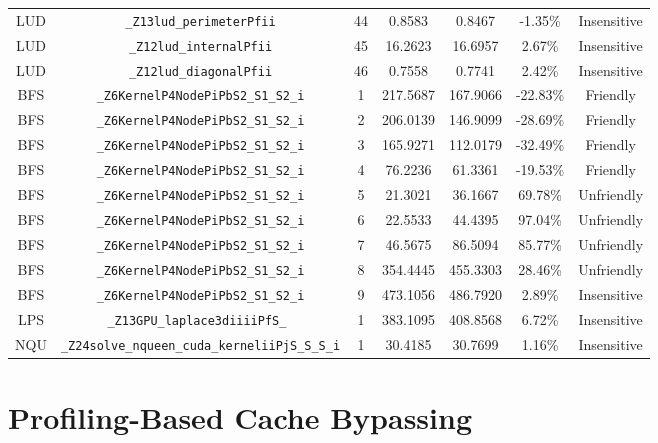 \documentclass{article}
\begin{document}
\begin{table}[H]
\begin{tabular}{c c c c c c c}
		LUD       & \verb|_Z13lud_perimeterPfii|                   & 44  & 0.8583   & 0.8467        & -1.35\%     & Insensitive \\
		LUD       & \verb|_Z12lud_internalPfii|                    & 45  & 16.2623  & 16.6957       & 2.67\%      & Insensitive \\
		LUD       & \verb|_Z12lud_diagonalPfii|                    & 46  & 0.7558   & 0.7741        & 2.42\%      & Insensitive \\
		BFS       & \verb|_Z6KernelP4NodePiPbS2_S1_S2_i|           & 1   & 217.5687 & 167.9066      & -22.83\%    & Friendly    \\
		BFS       & \verb|_Z6KernelP4NodePiPbS2_S1_S2_i|           & 2   & 206.0139 & 146.9099      & -28.69\%    & Friendly    \\
		BFS       & \verb|_Z6KernelP4NodePiPbS2_S1_S2_i|           & 3   & 165.9271 & 112.0179      & -32.49\%    & Friendly    \\
		BFS       & \verb|_Z6KernelP4NodePiPbS2_S1_S2_i|           & 4   & 76.2236  & 61.3361       & -19.53\%    & Friendly    \\
		BFS       & \verb|_Z6KernelP4NodePiPbS2_S1_S2_i|           & 5   & 21.3021  & 36.1667       & 69.78\%     & Unfriendly  \\
		BFS       & \verb|_Z6KernelP4NodePiPbS2_S1_S2_i|           & 6   & 22.5533  & 44.4395       & 97.04\%     & Unfriendly  \\
		BFS       & \verb|_Z6KernelP4NodePiPbS2_S1_S2_i|           & 7   & 46.5675  & 86.5094       & 85.77\%     & Unfriendly  \\
		BFS       & \verb|_Z6KernelP4NodePiPbS2_S1_S2_i|           & 8   & 354.4445 & 455.3303      & 28.46\%     & Unfriendly  \\
		BFS       & \verb|_Z6KernelP4NodePiPbS2_S1_S2_i|           & 9   & 473.1056 & 486.7920      & 2.89\%      & Insensitive \\
		LPS       & \verb|_Z13GPU_laplace3diiiiPfS_ |              & 1   & 383.1095 & 408.8568      & 6.72\%      & Insensitive \\
		NQU       & \verb|_Z24solve_nqueen_cuda_kerneliiPjS_S_S_i| & 1   & 30.4185  & 30.7699       & 1.16\%      & Insensitive \\
		[1ex] %
		\hline %
	\end{tabular}
	\label{table:cache} %
\end{table}

\section{Profiling-Based Cache Bypassing}
\end{document}
